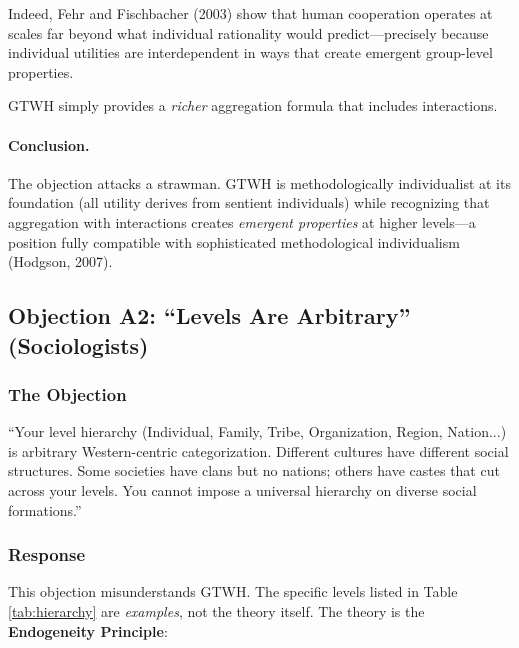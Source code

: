 \documentclass[12pt,a4paper]{article}
\begin{document}
Indeed, Fehr and Fischbacher (2003) show that human cooperation operates at 
scales far beyond what individual rationality would predict---precisely because 
individual utilities are interdependent in ways that create emergent group-level 
properties.

GTWH simply provides a \textit{richer} aggregation formula that includes interactions.

\paragraph{Conclusion.}

The objection attacks a strawman. GTWH is methodologically individualist at its 
foundation (all utility derives from sentient individuals) while recognizing 
that aggregation with interactions creates \textit{emergent properties} at 
higher levels---a position fully compatible with sophisticated methodological 
individualism (Hodgson, 2007).

\subsection{Objection A2: ``Levels Are Arbitrary'' (Sociologists)}
\label{app:levels-arbitrary}

\subsubsection{The Objection}

\begin{tcolorbox}[colback=red!5!white, colframe=red!75!black, title=Sociologist's Objection]
``Your level hierarchy (Individual, Family, Tribe, Organization, Region, 
Nation...) is arbitrary Western-centric categorization. Different cultures 
have different social structures. Some societies have clans but no nations; 
others have castes that cut across your levels. You cannot impose a universal 
hierarchy on diverse social formations.''
\end{tcolorbox}

\subsubsection{Response}

This objection misunderstands GTWH. The specific levels listed in Table 
\ref{tab:hierarchy} are \textit{examples}, not the theory itself. The theory 
is the \textbf{Endogeneity Principle}:
\end{document}
